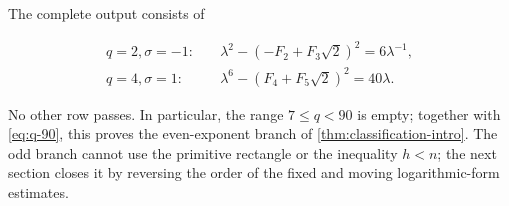 The complete output consists of

\begin{align}
 q=2, \sigma=-1:
 &\quad
 \lambda^2-(-F_2+F_3\sqrt2)^2
 =6\lambda^{-1},
 \label{eq:low-q2}\\
 q=4, \sigma=1:
 &\quad
 \lambda^6-(F_4+F_5\sqrt2)^2
 =40\lambda.
 \label{eq:low-q4}
\end{align}

No other row passes. In particular, the range $7\leqslant q<90$ is empty;
together with \cref{eq:q-90}, this proves the even-exponent branch of
\cref{thm:classification-intro}. The odd branch cannot use the primitive
rectangle or the inequality $h<n$; the next section closes it by reversing
the order of the fixed and moving logarithmic-form estimates.
